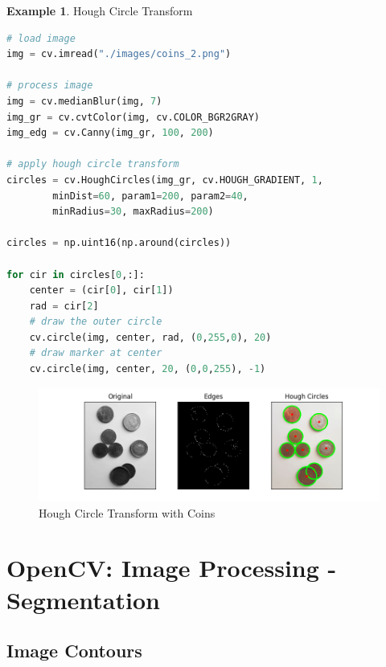 \documentclass{article}
\theoremstyle{definition}
\newtheorem{ex}{Example}[subsection]
\theoremstyle{remark}
\begin{document}
\begin{ex} Hough Circle Transform
\begin{lstlisting}[language=Python]
# load image
img = cv.imread("./images/coins_2.png")

# process image
img = cv.medianBlur(img, 7)
img_gr = cv.cvtColor(img, cv.COLOR_BGR2GRAY)
img_edg = cv.Canny(img_gr, 100, 200)

# apply hough circle transform
circles = cv.HoughCircles(img_gr, cv.HOUGH_GRADIENT, 1, 
		minDist=60, param1=200, param2=40, 
		minRadius=30, maxRadius=200)

circles = np.uint16(np.around(circles))

for cir in circles[0,:]:
    center = (cir[0], cir[1])
    rad = cir[2]
    # draw the outer circle
    cv.circle(img, center, rad, (0,255,0), 20)
    # draw marker at center
    cv.circle(img, center, 20, (0,0,255), -1)
\end{lstlisting}

\begin{figure}[H]
    \centering
    \includegraphics[width=\textwidth]{ocv_hough_circ}
    \caption{Hough Circle Transform with Coins}
    \label{fig:ocv_hct}
\end{figure}
\end{ex}


\break 


\section{OpenCV: Image Processing - Segmentation}

\subsection{Image Contours}
\end{document}
